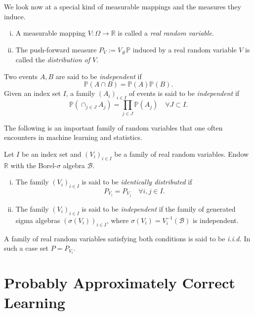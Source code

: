 We look now at a special kind of measurable mappings and the measures they induce.
\begin{definition}
	\label{def:RV}
	\begin{enumerate}[(i)]
		\item A measurable mapping $V: \Omega \to \mathbb{R}$ is called a \emph{real random variable}.
		\item The push-forward measure $P_V := V_\# \mathbb{P}$ induced by a real random variable $V$ 
		is called the \emph{distribution of $V$}.		
	\end{enumerate}
\end{definition}


\begin{definition}
Two events $A,B$ are said to be \emph{independent} if $$\mathbb{P}(A \cap B) = \mathbb{P}(A)\mathbb{P}(B).$$ Given 
an index set $I$, a family $(A_i)_{i \in I}$ of events is said to be \emph{independent}
if $$\mathbb{P}(\cap_{j \in J} A_j) = \prod_{j \in J} \mathbb{P}(A_j) \quad \forall J \subset I.$$	
\end{definition}

The following is an important family of random variables that one often encounters 
in machine learning and statistics. 
\begin{definition}
	\label{def:iid}
	Let $I$ be an index set and $(V_i)_{i \in I}$ be a family of real random 
	variables. Endow $\mathbb{R}$ with the Borel-$\sigma$ algebra $\mathcal{B}$.
	\begin{enumerate}[(i)]
		\item The family $(V_i)_{i \in I}$ is said to be \emph{identically distributed} if 
		$$P_{V_i} = P_{V_j} \quad \forall i, j \in I.$$
		\item The family $(V_i)_{i \in I}$ is said to be \emph{independent} if the 
		family of generated sigma algebras $(\sigma(V_i))_{i\in I}$, where 
		$\sigma(V_i) = V_i^{-1}(\mathcal{B})$ is independent.
	\end{enumerate}
A family of real random variables satisfying both conditions is said to be \emph{i.i.d.}
In such a case set $P = P_{V_i}$. \end{definition}

\section{Probably Approximately Correct Learning}

